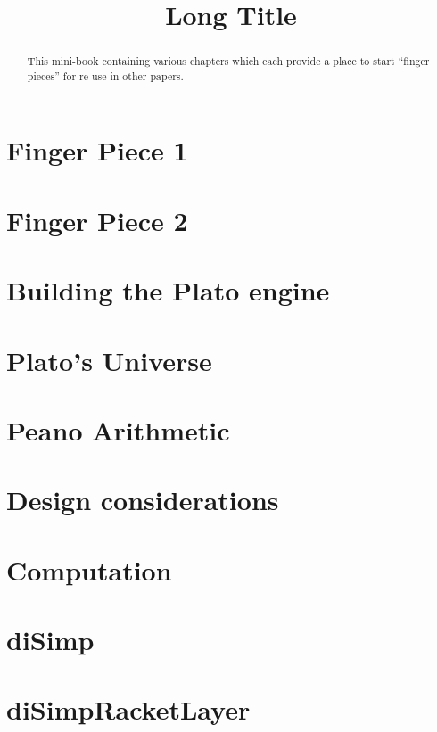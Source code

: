 \documentclass[a4paper,openany]{amsbook}
\begin{document}
\sloppy

\title[Short Title]{Long Title}

%

\begin{abstract}
This mini-book containing various chapters which each provide a place to start
``finger pieces'' for re-use in other papers.
\end{abstract} 
\maketitle 
\tableofcontents 


\chapter{Finger Piece 1}


\chapter{Finger Piece 2}


\chapter{Building the Plato engine}


\chapter{Plato's Universe}


\chapter{Peano Arithmetic}


\chapter{Design considerations}


\chapter{Computation}


\appendix
\chapter{diSimp}


\chapter{diSimpRacketLayer}



\printbibliography
\end{document}

